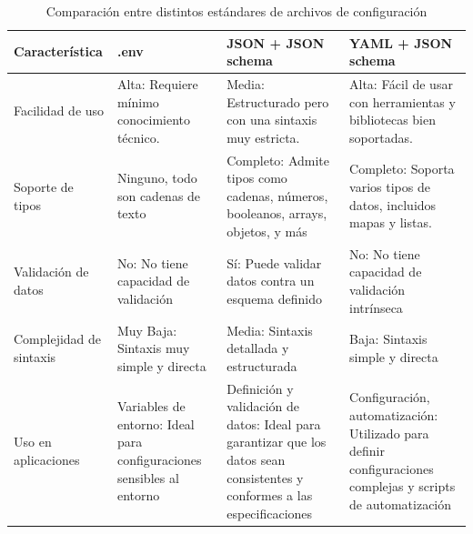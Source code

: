\begin{longtable}{|p{3cm}|p{4.5cm}|p{5cm}|p{4.5cm}|}
    \caption{Comparación entre distintos estándares de archivos de configuración}
    \label{table:config-files-comparison}                                                                                                                                                                                                                                                                                                      \\
    \hline
    \textbf{Característica} & \textbf{.env}                                                         & \textbf{JSON + JSON schema}                                                                                                & \textbf{YAML + JSON schema}                                                                                 \\
    \hline
    \endfirsthead
    Facilidad de uso        & Alta: Requiere mínimo conocimiento técnico.                           & Media: Estructurado pero con una sintaxis muy estricta.                                                                    & Alta: Fácil de usar con herramientas y bibliotecas bien soportadas.                                         \\
    \hline
    Soporte de tipos        & Ninguno, todo son cadenas de texto                                    & Completo: Admite tipos como cadenas, números, booleanos, arrays, objetos, y más                                            & Completo: Soporta varios tipos de datos, incluidos mapas y listas.                                          \\
    \hline
    Validación de datos     & No: No tiene capacidad de validación                                  & Sí: Puede validar datos contra un esquema definido                                                                         & No: No tiene capacidad de validación intrínseca                                                             \\
    \hline
    Complejidad de sintaxis & Muy Baja: Sintaxis muy simple y directa                               & Media: Sintaxis detallada y estructurada                                                                                   & Baja: Sintaxis simple y directa                                                                             \\
    \hline
    Uso en aplicaciones     & Variables de entorno: Ideal para configuraciones sensibles al entorno & Definición y validación de datos: Ideal para garantizar que los datos sean consistentes y conformes a las especificaciones & Configuración, automatización: Utilizado para definir configuraciones complejas y scripts de automatización \\

\end{longtable}
